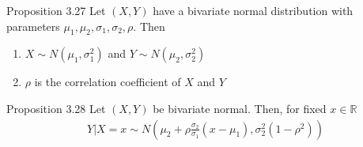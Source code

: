 %
%
\begin{boks}{Proposition 3.27}
  Let $(X,Y)$ have a bivariate normal distribution with parameters $\mu_1, \mu_2, \sigma_1, \sigma_2, \rho$. Then
  \begin{enumerate}
    \item $X \sim N(\mu_1, \sigma_1^2)$ and $Y \sim N(\mu_2, \sigma_2^2)$
    \item $\rho$ is the correlation coefficient of $X$ and $Y$
  \end{enumerate}
\end{boks}
\begin{boks}{Proposition 3.28}
  Let $(X, Y)$ be bivariate normal. Then, for fixed $x \in \mathbb{R}$
  \begin{align*}
    Y|X = x \sim N \left( \mu_2 + \rho\frac{\sigma_2}{\sigma_1}(x - \mu_1)
    , \sigma_2^2(1 - \rho^2) \right)
  \end{align*}
\end{boks}
%
